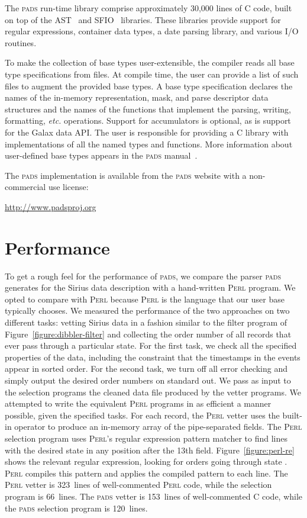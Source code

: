 \documentclass{sigplanconf}
\newcommand{\dibbler}{Sirius}
\newcommand{\figref}[1]{Figure~\ref{#1}}
\newcommand{\etc}{{\em etc.\/}}
\newcommand{\pads}{\textsc{pads}}
\newcommand{\C}{\textsc{C}}
\newcommand{\perl}{\textsc{Perl}}
\begin{document}
The \pads{} run-time library comprise approximately 30,000 lines of \C{} code, built on top of the AST~\cite{ast} and SFIO~\cite{sfio} libraries.
These libraries provide support for regular expressions, container data types, a date parsing library, and various I/O routines.  
 
To make the collection of base types user-extensible, the compiler reads all base type specifications from files.  
At compile time, the user can provide a list of such files to augment the provided base types.
A base type specification
declares the names of the in-memory representation, mask, and parse descriptor data structures and the names of the functions that implement the parsing, writing, formatting, \etc{} operations.  Support for accumulators is optional, as is support for the Galax data API.  The user is responsible for providing a \C{} library with implementations of all the named types and functions. 
More information about user-defined base types appears in the \pads{} manual~\cite{padsmanual}.

The \pads{} implementation is
available from the \pads{} website with a non-commercial use license:
\begin{center}
\url{http://www.padsproj.org}
\end{center}
 
\section{Performance}
To get a rough feel for the performance of \pads{}, we compare the parser \pads{} generates for the \dibbler{} data description with a hand-written \perl{} program.
We opted to compare with \perl{} because \perl{} is the language that our user base typically chooses. We measured the performance of the two approaches on two different tasks: 
vetting \dibbler{} data in a fashion similar to the filter program of
\figref{figure:dibbler-filter} and collecting the order number of all records that ever pass through a particular state.  For the first task, we check all the specified properties of the data, including the constraint that the timestamps in the events appear in sorted order.  For the second task, we turn off all error checking and simply output the desired order numbers on standard out.
We pass as input to the selection programs the cleaned data file produced by the vetter programs. 
We attempted to write the equivalent \perl{} programs in as efficient a manner possible, given the specified tasks.  For each record, the \perl{} vetter uses the built-in  operator to produce an in-memory array of the pipe-separated fields.  The \perl{} selection program uses \perl{}'s regular expression pattern matcher to find lines with the desired state in any 
position after the 13th field.  \figref{figure:perl-re} shows the relevant regular expression, looking for orders going through state .
\perl{} compiles this pattern and applies the compiled pattern to each line.  The \perl{} vetter is 323~lines of well-commented \perl{} code, while the selection program is 66~lines.  
The \pads{} vetter is 153~lines of well-commented \C{} code, while the \pads{} selection program is 120~lines. 
\end{document}
